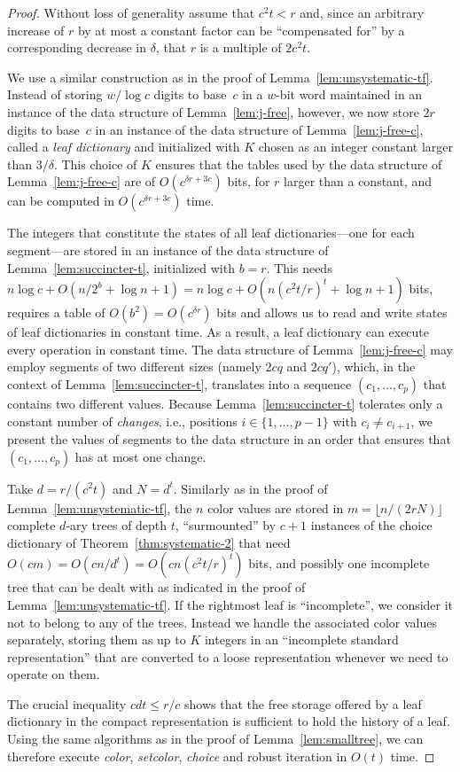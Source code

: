 \documentclass[envcountsame,envcountsect,undated,nolinenumbers]{lnthi}
\def\Tvn#1{\hbox{\textit{#1\/}}}
\def\Tfloor#1{\lfloor #1\rfloor}
\begin{document}
\begin{proof}
Without loss of generality assume that
$c^2 t<r$ and, since an arbitrary increase
of $r$ by at most a constant factor can be
``compensated for'' by a corresponding
decrease in $\delta$, that $r$ is a multiple of
$2 c^2 t$.

We use a similar construction as in the
proof of Lemma~\ref{lem:unsystematic-tf}.
Instead of storing ${w/{\log c}}$ digits to base~$c$
in a $w$-bit word maintained
in an instance of the data structure of
Lemma~\ref{lem:j-free}, however, we now
store $2 r$ digits to base~$c$ in an
instance of the data structure of
Lemma~\ref{lem:j-free-c}, 
called a \emph{leaf dictionary}
and
initialized with
$K$ chosen as an integer
constant larger than $3/\delta$.
This choice of $K$ ensures that the tables used
by the data structure of Lemma~\ref{lem:j-free-c}
are of
$O(c^{\delta r+3 c})$ bits,
for $r$ larger than a constant,
and can be computed in $O(c^{\delta r+3 c})$ time.

The integers that constitute the states of all
leaf dictionaries---one for each segment---are stored in an instance
of the data structure of
Lemma~\ref{lem:succincter-t}, initialized with $b=r$.
This needs $n\log c+O({n/{2^b}}+\log n+1)=
n\log c+O(n({{c^2 t}/r})^t+\log n+1)$ bits, requires a
table of $O(b^2)=O(c^{\delta r})$ bits and
allows us to read and write states of
leaf dictionaries in constant time.
As a result, a leaf dictionary can execute
every operation in constant time.
The data structure of
Lemma~\ref{lem:j-free-c} may employ segments of two
different sizes (namely $2 c q$ and $2 c q'$),
which, in the context of Lemma~\ref{lem:succincter-t},
translates into a sequence $(c_1,\ldots,c_p)$
that contains two different values.
Because Lemma~\ref{lem:succincter-t} tolerates only
a constant number of \emph{changes}, i.e.,
positions $i\in\{1,\ldots,p-1\}$ with
$c_i\not=c_{i+1}$, we present the values of
segments to the data structure in an order
that ensures that $(c_1,\ldots,c_p)$ has
at most one change.

Take $d={r/{(c^2 t)}}$ and $N=d^t$.
Similarly as in the proof of Lemma~\ref{lem:unsystematic-tf},
the $n$ color values are stored in
$m=\Tfloor{{n/{(2 r N)}}}$ complete $d$-ary trees
of depth $t$, ``surmounted'' by $c+1$ instances
of the choice dictionary of
Theorem~\ref{thm:systematic-2} that need
$O(c m)=O({{c n}/{d^t}})=
O(c n({{c^2 t}/r})^t)$ bits,
and possibly one incomplete tree that can
be dealt with as indicated
in the proof of
Lemma~\ref{lem:unsystematic-tf}.
If the rightmost leaf is ``incomplete'',
we consider it not to belong to any of the trees.
Instead we handle the associated color values separately,
storing them as up to $K$ integers in an  
``incomplete standard representation''
that are converted to a loose representation
whenever we need to operate on them.

The crucial inequality
$c d t\le {r/c}$ shows that the free storage
offered by a leaf dictionary in the compact representation
is sufficient to hold the history of a leaf.
Using the same algorithms as in the proof of
Lemma~\ref{lem:smalltree}, we can therefore
execute \Tvn{color}, \Tvn{setcolor}, \Tvn{choice}
and robust iteration in $O(t)$ time.
\end{proof}
\end{document}
